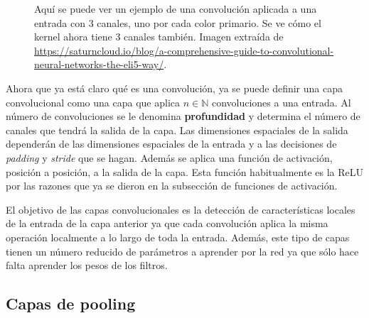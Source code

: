 \begin{figure}[h]
\noindent
{}
\caption{Aquí se puede ver un ejemplo de una convolución aplicada a una entrada con 3 canales, uno por cada color primario. Se ve cómo el kernel ahora tiene 3 canales también. Imagen extraída de \url{https://saturncloud.io/blog/a-comprehensive-guide-to-convolutional-neural-networks-the-eli5-way/}.}
\label{fig:ejemplo_convolucion_3canales}
\end{figure}

Ahora que ya está claro qué es una convolución, ya se puede definir una capa convolucional como una capa que aplica $n\in \mathbb{N}$ convoluciones a una entrada. Al número de convoluciones se le denomina \textbf{profundidad} y determina el número de canales que tendrá la salida de la capa. Las dimensiones espaciales de la salida dependerán de las dimensiones espaciales de la entrada y a las decisiones de \textit{padding} y \textit{stride} que se hagan. Además se aplica una función de activación, posición a posición, a la salida de la capa. Esta función habitualmente es la ReLU por las razones que ya se dieron en la subsección de funciones de activación.

El objetivo de las capas convolucionales es la detección de características locales de la entrada de la capa anterior ya que cada convolución aplica la misma operación localmente a lo largo de toda la entrada. Además, este tipo de capas tienen un número reducido de parámetros a aprender por la red ya que sólo hace falta aprender los pesos de los filtros.

\subsection*{Capas de pooling}

